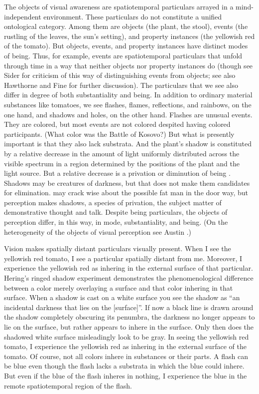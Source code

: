 \documentclass[12pt]{article}
\begin{document}
The objects of visual awareness are spatiotemporal particulars arrayed in a mind-independent environment. These particulars do not constitute a unified ontological category. Among them are objects (the plant, the stool), events (the rustling of the leaves, the sun's setting), and property instances (the yellowish red of the tomato). But objects, events, and property instances have distinct modes of being. Thus, for example, events are spatiotemporal particulars that unfold through time in a way that neither objects nor property instances do (though see Sider \citeyear{Sider:1997fk} for criticism of this way of distinguishing events from objects; see also Hawthorne \citeyear{Hawthorne:2008uq} and Fine \citeyear{Fine:2006fk} for further discussion). The particulars that we see also differ in degree of both substantiality and being. In addition to ordinary material substances like tomatoes, we see flashes, flames, reflections, and rainbows, on the one hand, and shadows and holes, on the other hand. Flashes are unusual events. They are colored, but most events are not colored despited having colored participants. (What color was the Battle of Kosovo?) But what is presently important is that they also lack substrata. And the plant's shadow is constituted by a relative decrease in the amount of light uniformly distributed across the visible spectrum in a region determined by the positions of the plant and the light source. But a relative decrease is a privation or diminution of being \citep[see][]{Sorensen:2008kx}. Shadows may be creatures of darkness, but that does not make them candidates for elimination. \citet{Quine:1948ef} may crack wise about the possible fat man in the door way, but perception makes shadows, a species of privation, the subject matter of demonstrative thought and talk. Despite being particulars, the objects of perception differ, in this way, in mode, substantiality, and being. (On the heterogeneity of the objects of visual perception see Austin \citeyear{Austin:1962lr}.)

Vision makes spatially distant particulars visually present. When I see the yellowish red tomato, I see a particular spatially distant from me. Moreover, I experience the yellowish red as inhering in the external surface of that particular. Hering's \citeyearpar[8]{Hering:1920ty} ringed shadow experiment demonstrates the phenomenological difference between a color merely overlaying a surface and that color inhering in that surface. When a shadow is cast on a white surface you see the shadow as ``an incidental darkness that lies on the [surface]''. If now a black line is drawn around the shadow completely obscuring its penumbra, the darkness no longer appears to lie on the surface, but rather appears to inhere in the surface. Only then does the shadowed white surface misleadingly look to be gray. In seeing the yellowish red tomato, I experience the yellowish red as inhering in the external surface of the tomato. Of course, not all colors inhere in substances or their parts. A flash can be blue even though the flash lacks a substrata in which the blue could inhere. But even if the blue of the flash inheres in nothing, I experience the blue in the remote spatiotemporal region of the flash. 
\end{document}
